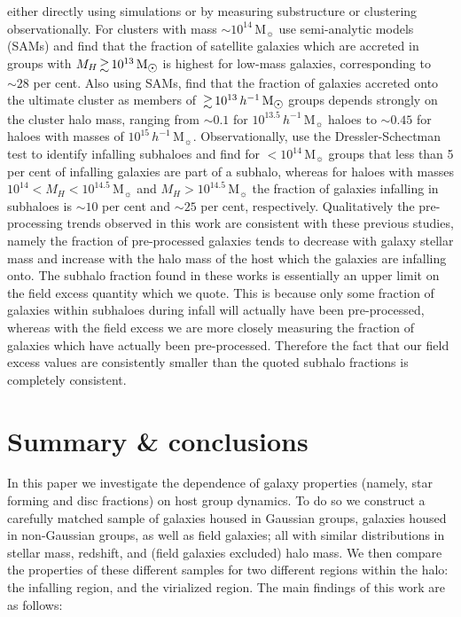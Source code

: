 \documentclass[a4paper,fleqn,usenatbib]{mnras}
\newcommand{\Msun}{\,\mathrm{M_{\sun}}}
\begin{document}
either directly using simulations or by measuring substructure or
clustering observationally.  For clusters with mass $\sim
10^{14}\Msun$ \citet{delucia2012} use semi-analytic models (SAMs) and find
that the fraction of satellite galaxies which are accreted in groups
with $M_H \ga 10^{13}\Msun$ is highest for low-mass galaxies,
corresponding to $\sim 28$ per cent.  Also using SAMs,
\citet{mcgee2009} find that the fraction of galaxies accreted onto the
ultimate cluster as members of $\ga 10^{13}\,h^{-1}\Msun$ groups depends
strongly on the cluster halo mass, ranging from $\sim 0.1$ for
$10^{13.5}\,h^{-1}\Msun$ haloes to $\sim 0.45$ for haloes with masses
of $10^{15}\,h^{-1}\Msun$.  Observationally, \citet{hou2014} use the
Dressler-Schectman test \citep{dressler1988} to identify infalling
subhaloes and find for $<10^{14}\Msun$ groups that less than 5 per
cent of infalling galaxies are part of a subhalo, whereas for haloes
with masses $10^{14} < M_H < 10^{14.5}\Msun$ and $M_H >
10^{14.5}\Msun$ the fraction of galaxies infalling in subhaloes is
$\sim 10$ per cent and $\sim 25$ per cent, respectively.
Qualitatively the pre-processing trends observed in this work are
consistent with these previous studies, namely the fraction of
pre-processed galaxies tends to decrease with galaxy stellar mass and
increase with the halo mass of the host which the galaxies are
infalling onto.  The subhalo fraction found in these works is
essentially an upper limit on the field excess quantity which we
quote.  This is because only some fraction of galaxies within subhaloes
during infall will actually have been pre-processed, whereas with the
field excess we are more closely measuring the fraction of galaxies
which have actually been pre-processed.  Therefore the fact that our
field excess values are consistently smaller than the quoted subhalo
fractions is completely consistent.


\section{Summary \& conclusions}
\label{sec:summary}

In this paper we investigate the dependence of galaxy properties
(namely, star forming and disc fractions) on host group dynamics.  To
do so we construct a carefully matched sample of galaxies housed in
Gaussian groups, galaxies housed in non-Gaussian groups, as well as
field galaxies; all with similar distributions in stellar mass,
redshift, and (field galaxies excluded) halo mass.  We then compare
the properties of these different samples for two different regions
within the halo: the infalling region, and the virialized region.  The
main findings of this work are as follows:
\end{document}
